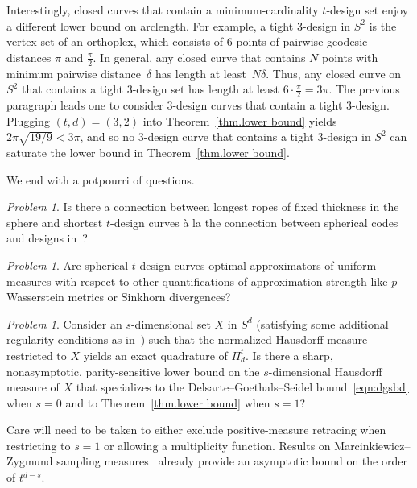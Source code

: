 \documentclass[12pt]{article}
\theoremstyle{plain}
\theoremstyle{definition}
\theoremstyle{remark}
\newtheorem{prob}[thm]{Problem}
\begin{document}
Interestingly, closed curves that contain a minimum-cardinality $t$-design set enjoy a different lower bound on arclength.
For example, a tight $3$-design in $S^2$ is the vertex set of an orthoplex, which consists of $6$ points of pairwise geodesic distances $\pi$ and $\frac{\pi}{2}$.
In general, any closed curve that contains $N$ points with minimum pairwise distance~$\delta$ has length at least~$N\delta$.
Thus, any closed curve on $S^2$ that contains a tight $3$-design set has length at least $6\cdot \frac{\pi}{2} = 3 \pi$.
The previous paragraph leads one to consider $3$-design curves that contain a tight $3$-design.
Plugging $(t,d)=(3,2)$ into Theorem~\ref{thm.lower bound} yields $2 \pi \sqrt{19/9}<3\pi$, and so no $3$-design curve that contains a tight $3$-design in $S^2$ can saturate the lower bound in Theorem~\ref{thm.lower bound}.

We end with a potpourri of questions.


\begin{prob}
    Is there a connection between longest ropes of fixed thickness in the sphere \cite{GerlachM:11,GerlachM:11b} and shortest $t$-design curves \`a la the connection between spherical codes and designs in~\cite{DelsarteGS:77}?
\end{prob}

\begin{prob}
Are spherical $t$-design curves optimal approximators of uniform measures with respect to other quantifications of approximation strength like $p$-Wasserstein metrics or Sinkhorn divergences?
\end{prob}


\begin{prob}
Consider an $s$-dimensional set $X$ in $S^d$ (satisfying some additional regularity conditions as in~\cite{EhlerG:25}) such that the normalized Hausdorff measure restricted to $X$ yields an exact quadrature of $\Pi_d^t$. Is there a sharp, nonasymptotic, parity-sensitive lower bound on the $s$-dimensional Hausdorff measure of $X$ that specializes to the Delsarte--Goethals--Seidel bound~\eqref{eqn:dgsbd}
when $s=0$ and to Theorem~\ref{thm.lower bound} when $s=1$?
\end{prob}

Care will need to be taken to either exclude positive-measure retracing when restricting to $s=1$ or allowing a multiplicity function.
Results on Marcinkiewicz--Zygmund sampling measures~\cite{EhlerG:25} already provide an asymptotic bound on the order of $t^{d-s}$.
\end{document}
